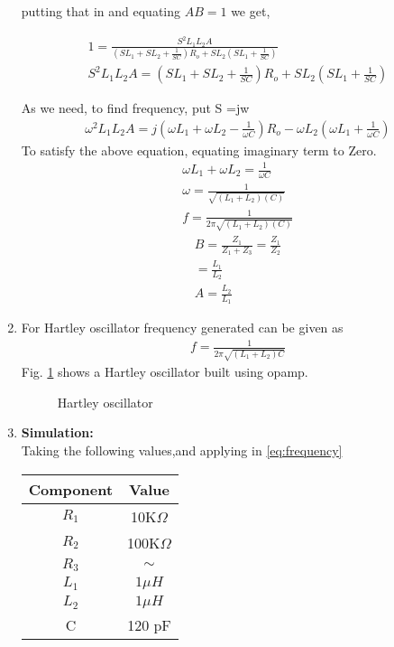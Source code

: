 \begin{enumerate}[label=\thesection.\arabic*.,ref=\thesection.\theenumi]
putting that in and equating $AB=1$ we get,

\begin{align}
1 = \frac{S^{2}L_1L_2A}{(SL_1+SL_2+\frac{1}{SC})R_o+ SL_2(SL_1+\frac{1}{SC})}\\
S^{2}L_1L_2A = (SL_1+SL_2+\frac{1}{SC})R_o+ SL_2(SL_1+\frac{1}{SC})
\end{align}

As we need, to find frequency, put S =jw
\begin{align}
    \omega^{2}L_1L_2A = j(\omega L_1 + \omega L_2 -\frac{1}{\omega C})R_o -\omega L_2(\omega L_1 + \frac{1}{\omega C})
\end{align}
To satisfy the above equation, equating imaginary term to Zero.
\begin{align}    
    \omega L_1 + \omega L_2  = \frac{1}{\omega C}\\
    \omega = \frac{1}{\sqrt{(L_1+L_2)(C)}}\\
    f = \frac{1}{2\pi \sqrt{(L_1+L_2)(C)}}
\end{align}
\begin{align}
    B = \frac{Z_1}{Z_1 + Z_3} = \frac{Z_1}{Z_2}\\
      = \frac{L_1}{L_2}\\
    A =  \frac{L_2}{L_1} 
\end{align}
 
\item For Hartley oscillator frequency generated can be given as 
\begin{align}
    f = \frac{1}{2\pi\sqrt{(L_1 + L_2)C}}
    \label{eq:frequency}
\end{align}
Fig. \ref{fig:ee18btech11019_hart} shows a
Hartley oscillator built using opamp.\\

\begin{figure}[ht]
    \begin{center}
	    \resizebox{\columnwidth}{!}{}
	\end{center}
\caption{Hartley oscillator}
\label{fig:ee18btech11019_hart}
\end{figure}
\newline
\item \textbf{Simulation:}\\
Taking the following values,and applying in \ref{eq:frequency} \\



\begin{tabular}{|c|c|}
\hline
Component & Value  \\
\hline
$R_1$         & 10K$\Omega$   \\
\hline
$R_2$         & 100K$\Omega$   \\
\hline
$R_3$         & $\sim$  \\
\hline
$L_1$         & $1 \mu H$     \\
\hline
$L_2$         & $1 \mu H$   \\
\hline
C         & 120 pF \\
\hline
\end{tabular}



\end{enumerate}
